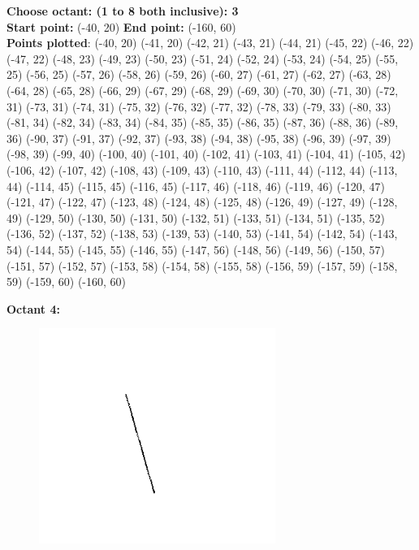 \documentclass[12pt,letterpaper]{article}
\begin{document}
\textbf{Choose octant: (1 to 8 both inclusive): 3}\\
\textbf{Start point:} (-40, 20)
\textbf{End point:} (-160, 60)\\
\textbf{Points plotted}:
(-40, 20) (-41, 20) (-42, 21) (-43, 21) 
(-44, 21) (-45, 22) (-46, 22) (-47, 22) 
(-48, 23) (-49, 23) (-50, 23) (-51, 24) 
(-52, 24) (-53, 24) (-54, 25) (-55, 25) 
(-56, 25) (-57, 26) (-58, 26) (-59, 26) 
(-60, 27) (-61, 27) (-62, 27) (-63, 28) 
(-64, 28) (-65, 28) (-66, 29) (-67, 29) 
(-68, 29) (-69, 30) (-70, 30) (-71, 30) 
(-72, 31) (-73, 31) (-74, 31) (-75, 32) 
(-76, 32) (-77, 32) (-78, 33) (-79, 33) 
(-80, 33) (-81, 34) (-82, 34) (-83, 34) 
(-84, 35) (-85, 35) (-86, 35) (-87, 36) 
(-88, 36) (-89, 36) (-90, 37) (-91, 37) 
(-92, 37) (-93, 38) (-94, 38) (-95, 38) 
(-96, 39) (-97, 39) (-98, 39) (-99, 40) 
(-100, 40) (-101, 40) (-102, 41) (-103, 41) 
(-104, 41) (-105, 42) (-106, 42) (-107, 42) 
(-108, 43) (-109, 43) (-110, 43) (-111, 44) 
(-112, 44) (-113, 44) (-114, 45) (-115, 45) 
(-116, 45) (-117, 46) (-118, 46) (-119, 46) 
(-120, 47) (-121, 47) (-122, 47) (-123, 48) 
(-124, 48) (-125, 48) (-126, 49) (-127, 49) 
(-128, 49) (-129, 50) (-130, 50) (-131, 50) 
(-132, 51) (-133, 51) (-134, 51) (-135, 52) 
(-136, 52) (-137, 52) (-138, 53) (-139, 53) 
(-140, 53) (-141, 54) (-142, 54) (-143, 54) 
(-144, 55) (-145, 55) (-146, 55) (-147, 56) 
(-148, 56) (-149, 56) (-150, 57) (-151, 57) 
(-152, 57) (-153, 58) (-154, 58) (-155, 58) 
(-156, 59) (-157, 59) (-158, 59) (-159, 60) 
(-160, 60) 


\newpage
\textbf{Octant 4:}
\begin{figure}[h]
    \centering
    \includegraphics[height=7cm]{Outputs/O4-1.png}
\end{figure}
\end{document}
